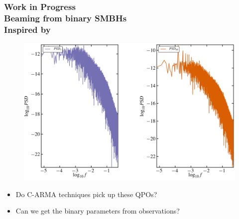 \documentclass[hyperref={pdfpagelabels=false}]{beamer}
\begin{document}
\begin{frame}
\frametitle{Work in Progress\\Beaming from binary SMBHs\\{\tiny Inspired by \citet*{binarySMBHNature15}}}
        \begin{figure}
          \includegraphics[scale=0.05]{images/beamedPSD.jpg}
        \end{figure}
\begin{itemize}
  \item Do C-ARMA techniques pick up these QPOs?
  \item Can we get the binary parameters from observations?
\end{itemize}
\end{frame}
\end{document}
